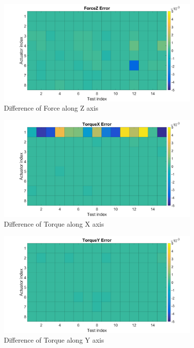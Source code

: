 \begin{figure}
	\begin{center}
		\includegraphics[width=0.9\textwidth]{./images/Result3.png}%
		\caption{Difference of Force along Z axis}
		\label{fig:forcez}%
	\end{center}
\end{figure}

\begin{figure}
	\begin{center}
		\includegraphics[width=0.9\textwidth]{./images/Result4.png}%
		\caption{Difference of Torque along X axis}
		\label{fig:torquex}%
	\end{center}
\end{figure}

\begin{figure}
	\begin{center}
		\includegraphics[width=0.9\textwidth]{./images/Result5.png}%
		\caption{Difference of Torque along Y axis}
		\label{fig:torquey}%
	\end{center}
\end{figure}

